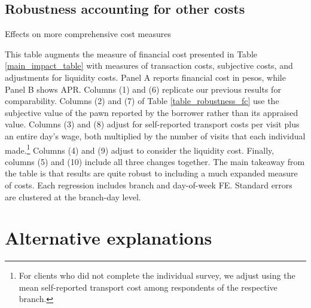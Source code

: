 \subsection{Robustness accounting for other costs}

\begin{table}[!h]
\caption{Effects on more comprehensive cost measures}
\label{table_robustness_fc}
\begin{center}
\scriptsize{}
\end{center}
 \scriptsize{ This table augments the measure of financial cost presented in Table \ref{main_impact_table} with measures of transaction costs, subjective costs, and adjustments for liquidity costs. Panel A reports financial cost in pesos, while Panel B shows APR. Columns (1) and (6) replicate our previous results for comparability. Columns (2) and (7) of Table \ref{table_robustness_fc} use the subjective value of the pawn reported by the borrower rather than its appraised value. Columns (3) and (8) adjust for self-reported transport costs per visit plus an entire day's wage, both multiplied by the number of visits that each individual made.\footnote{For clients who did not complete the individual survey, we adjust using the mean self-reported transport cost among respondents of the respective branch.} Columns (4) and (9) adjust to consider the liquidity cost. Finally, columns (5) and (10) include all three changes together. The main takeaway from the table is that results are quite robust to including a much expanded measure of costs. Each regression includes branch and day-of-week FE. Standard errors are clustered at the branch-day level.}
\end{table}

\section{ Alternative explanations}



